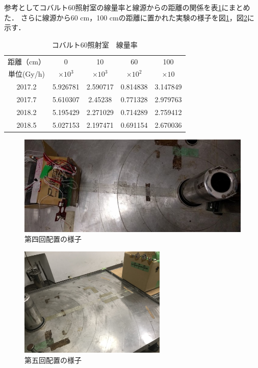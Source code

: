 参考としてコバルト60照射室の線量率と線源からの距離の関係を表\ref{tab:tidrate}にまとめた．
さらに線源から60 cm，100 cmの距離に置かれた実験の様子を図\ref{fig4-1-1}，図\ref{fig4-1-3}に示す．

\begin{table}[htbp]
	\centering
	\caption{コバルト60照射室　線量率}
	\label{tab:tidrate}
	
	\begin{tabular}{c|cccc}
		\hline\hline
		距離（cm）   & 0        & 10       & 60       & 100      \\
		単位(Gy/h) & $\times10^3$     & $\times10^3$     & $\times10^2$        & $\times10$      \\ \hline
		2017.2   & 5.926781 & 2.590717 & 0.814838 & 3.147849 \\
		2017.7        & 5.610307 & 2.45238  & 0.771328 & 2.979763 \\
		2018.2   & 5.195429 & 2.271029 & 0.714289 & 2.759412 \\
		2018.5        & 5.027153 & 2.197471 & 0.691154 & 2.670036 \\ \hline\hline
	\end{tabular}
\end{table}



\begin{figure}[htbp]
	\centering
	\includegraphics[scale=0.9]{04/fig/4-1-1.jpg}
	\caption{第四回配置の様子}
	\label{fig4-1-1}
\end{figure}


\begin{figure}[htbp]
	\centering
	\includegraphics[width=70mm]{04/fig/4-1-3.jpg}
	\caption{第五回配置の様子}
	\label{fig4-1-3}
\end{figure}

